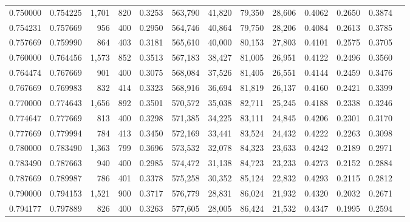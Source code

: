 \begin{tabular}{rrrrrrrrrrrrr}
0.750000 & 0.754225 &  1,701 &   820 &                                     0.3253 & 563,790 &  41,820 &  79,350 &  28,606 & 0.4062 & 0.2650 & 0.3874 \\
0.754231 & 0.757669 &    956 &   400 &                                     0.2950 & 564,746 &  40,864 &  79,750 &  28,206 & 0.4084 & 0.2613 & 0.3785 \\
0.757669 & 0.759990 &    864 &   403 &                                     0.3181 & 565,610 &  40,000 &  80,153 &  27,803 & 0.4101 & 0.2575 & 0.3705 \\
0.760000 & 0.764456 &  1,573 &   852 &                                     0.3513 & 567,183 &  38,427 &  81,005 &  26,951 & 0.4122 & 0.2496 & 0.3560 \\
0.764474 & 0.767669 &    901 &   400 &                                     0.3075 & 568,084 &  37,526 &  81,405 &  26,551 & 0.4144 & 0.2459 & 0.3476 \\
0.767669 & 0.769983 &    832 &   414 &                                     0.3323 & 568,916 &  36,694 &  81,819 &  26,137 & 0.4160 & 0.2421 & 0.3399 \\
0.770000 & 0.774643 &  1,656 &   892 &                                     0.3501 & 570,572 &  35,038 &  82,711 &  25,245 & 0.4188 & 0.2338 & 0.3246 \\
0.774647 & 0.777669 &    813 &   400 &                                     0.3298 & 571,385 &  34,225 &  83,111 &  24,845 & 0.4206 & 0.2301 & 0.3170 \\
0.777669 & 0.779994 &    784 &   413 &                                     0.3450 & 572,169 &  33,441 &  83,524 &  24,432 & 0.4222 & 0.2263 & 0.3098 \\
0.780000 & 0.783490 &  1,363 &   799 &                                     0.3696 & 573,532 &  32,078 &  84,323 &  23,633 & 0.4242 & 0.2189 & 0.2971 \\
0.783490 & 0.787663 &    940 &   400 &                                     0.2985 & 574,472 &  31,138 &  84,723 &  23,233 & 0.4273 & 0.2152 & 0.2884 \\
0.787669 & 0.789987 &    786 &   401 &                                     0.3378 & 575,258 &  30,352 &  85,124 &  22,832 & 0.4293 & 0.2115 & 0.2812 \\
0.790000 & 0.794153 &  1,521 &   900 &                                     0.3717 & 576,779 &  28,831 &  86,024 &  21,932 & 0.4320 & 0.2032 & 0.2671 \\
0.794177 & 0.797889 &    826 &   400 &                                     0.3263 & 577,605 &  28,005 &  86,424 &  21,532 & 0.4347 & 0.1995 & 0.2594 \\

\end{tabular}
